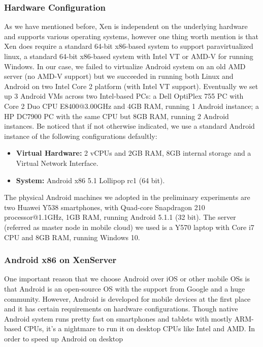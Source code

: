 \documentclass[journal,comsoc]{IEEEtran}
\begin{document}
\subsubsection{Hardware Configuration}
As we have mentioned before, Xen is independent on the underlying hardware and supports various operating systems, however one thing worth mention is that Xen does require a standard 64-bit x86-based system to support paravirtualized linux, a standard 64-bit x86-based system with Intel VT or AMD-V for running Windows. In our case, we failed to virtualize Android system on an  old AMD server (no AMD-V support) but we succeeded in running both Linux and Android on two Intel Core 2 platform (with Intel VT support). Eventually we set up 3 Android VMs across two Intel-based PCs: a Dell OptiPlex 755 PC with Core 2 Duo CPU E8400@3.00GHz and 4GB RAM, running 1 Android instance; a HP DC7900 PC with the same CPU but 8GB RAM, running 2 Android instances. Be noticed that if not otherwise indicated, we use a standard Android instance of the following configurations defaultly:
\begin{itemize}
	\item {\bf Virtual Hardware: }2 vCPUs and 2GB RAM, 8GB internal storage and a Virtual Network Interface.
	\item {\bf System: }Android x86 5.1 Lollipop rc1 (64 bit).
\end{itemize}

The physical Android machines we adopted in the preliminary experiments are two Huawei Y538 smartphones, with Quad-core Snapdragon 210 processor@1.1GHz, 1GB RAM, running Android 5.1.1 (32 bit). The server (referred as master node in mobile cloud) we used is a Y570 laptop with Core i7 CPU and 8GB RAM, running Windows 10.

\subsubsection{Android x86 on XenServer}
One important reason that we choose Android over iOS or other mobile OSs is that Android is an open-source OS with the support from Google and a huge community. However, Android is developed for mobile devices at the first place and it has certain requirements on hardware configurations. Though native Android system runs pretty fast on smartphones and tablets with mostly ARM-based CPUs, it's a nightmare to run it on desktop CPUs like Intel and AMD. In order to speed up Android on desktop
\end{document}
